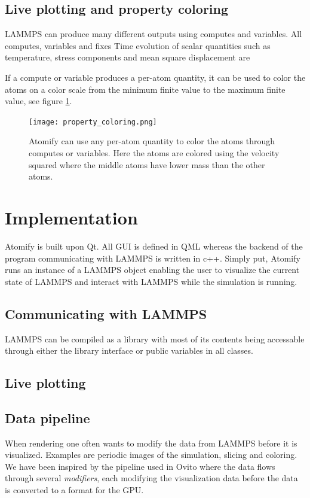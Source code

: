 \documentclass[aps,pre,twocolumn,letterpaper,floatfix]{revtex4}
\begin{document}
\subsection{Live plotting and property coloring}
LAMMPS can produce many different outputs using computes and variables. All computes, variables and fixes Time evolution of scalar quantities such as temperature, stress components and mean square displacement are 

If a compute or variable produces a per-atom quantity, it can be used to color the atoms on a color scale from the minimum finite value to the maximum finite value, see figure \ref{fig:property_coloring}. 

\begin{figure}
	\centering
	\texttt{[image: property\_coloring.png]}
	\caption{Atomify can use any per-atom quantity to color the atoms through computes or variables. Here the atoms are colored using the velocity squared where the middle atoms have lower mass than the other atoms. }
	\label{fig:property_coloring}
\end{figure}

\section{Implementation}
Atomify is built upon Qt. All GUI is defined in QML whereas the backend of the program communicating with LAMMPS is written in c++. Simply put, Atomify runs an instance of a LAMMPS object enabling the user to visualize the current state of LAMMPS and interact with LAMMPS while the simulation is running. 

\subsection{Communicating with LAMMPS}
LAMMPS can be compiled as a library with most of its contents being accessable through either the library interface or public variables in all classes. 

\subsection{Live plotting}

\subsection{Data pipeline}
When rendering one often wants to modify the data from LAMMPS before it is visualized. Examples are periodic images of the simulation, slicing and coloring. We have been inspired by the pipeline used in Ovito where the data flows through several \textit{modifiers}, each modifying the visualization data before the data is converted to a format for the GPU.
\end{document}
